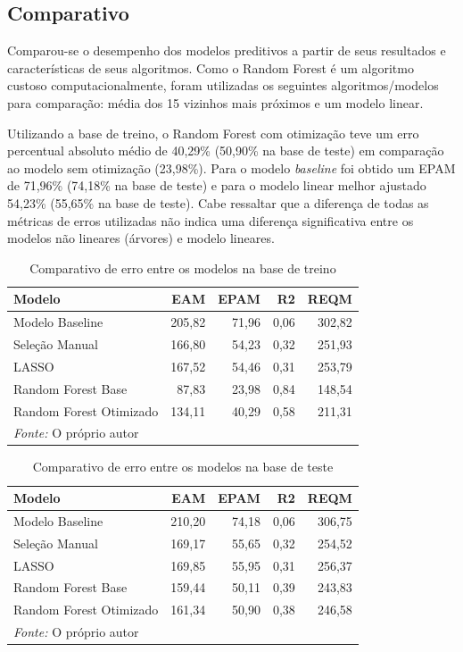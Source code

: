 \documentclass[
	12pt,				%
	a4paper,		%
	oneside,    %
	chapter=TITLE,		   %
	section=TITLE,		   %
	subsection=TITLE,	   %
	subsubsection=TITLE, %
	english,			%
	french,				%
	spanish,			%
	brazil,				%
]{abntex2}
\begin{document}
\hypertarget{comparativo}{%
\subsection{Comparativo}\label{comparativo}}

Comparou-se o desempenho dos modelos preditivos a partir de seus
resultados e características de seus algoritmos. Como o Random Forest é
um algoritmo custoso computacionalmente, foram utilizadas os seguintes
algoritmos/modelos para comparação: média dos 15 vizinhos mais próximos
e um modelo linear.

Utilizando a base de treino, o Random Forest com otimização teve um erro
percentual absoluto médio de 40,29\% (50,90\% na base de teste) em
comparação ao modelo sem otimização (23,98\%). Para o modelo
\emph{baseline} foi obtido um EPAM de 71,96\% (74,18\% na base de teste)
e para o modelo linear melhor ajustado 54,23\% (55,65\% na base de
teste). Cabe ressaltar que a diferença de todas as métricas de erros
utilizadas não indica uma diferença significativa entre os modelos não
lineares (árvores) e modelo lineares.

\begin{table}

\caption{\label{tab:comp_erro}Comparativo de erro entre os modelos na base de treino}
\centering
\begin{tabular}[t]{l|r|r|r|r}
\hline
Modelo & EAM & EPAM & R2 & REQM\\
\hline
Modelo Baseline & 205,82 & 71,96 & 0,06 & 302,82\\
\hline
Seleção Manual & 166,80 & 54,23 & 0,32 & 251,93\\
\hline
LASSO & 167,52 & 54,46 & 0,31 & 253,79\\
\hline
Random Forest Base & 87,83 & 23,98 & 0,84 & 148,54\\
\hline
Random Forest Otimizado & 134,11 & 40,29 & 0,58 & 211,31\\
\hline
\multicolumn{5}{l}{\textit{Fonte: } O próprio autor}\\
\end{tabular}
\end{table}

\begin{table}

\caption{\label{tab:comp_erro_teste}Comparativo de erro entre os modelos na base de teste}
\centering
\begin{tabular}[t]{l|r|r|r|r}
\hline
Modelo & EAM & EPAM & R2 & REQM\\
\hline
Modelo Baseline & 210,20 & 74,18 & 0,06 & 306,75\\
\hline
Seleção Manual & 169,17 & 55,65 & 0,32 & 254,52\\
\hline
LASSO & 169,85 & 55,95 & 0,31 & 256,37\\
\hline
Random Forest Base & 159,44 & 50,11 & 0,39 & 243,83\\
\hline
Random Forest Otimizado & 161,34 & 50,90 & 0,38 & 246,58\\
\hline
\multicolumn{5}{l}{\textit{Fonte: } O próprio autor}\\
\end{tabular}
\end{table}
\end{document}
